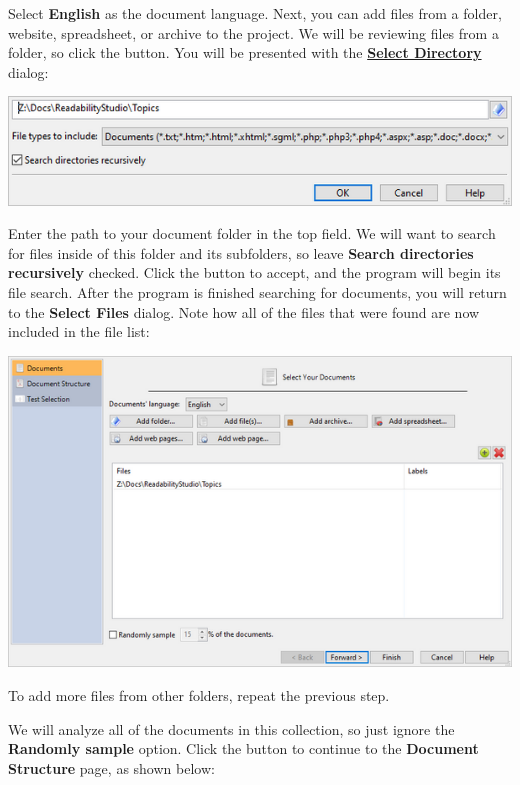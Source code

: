 \documentclass[
]{book}
\theoremstyle{definition}
\theoremstyle{definition}
\theoremstyle{definition}
\theoremstyle{definition}
\theoremstyle{remark}
\begin{document}
Select \textbf{English} as the document language. Next, you can add files from a folder, website, spreadsheet, or archive to the project. We will be reviewing files from a folder, so click the  button. You will be presented with the \protect\hyperlink{select-directory}{\textbf{Select Directory}} dialog:

\begin{center}\includegraphics[width=0.75\linewidth,]{Images/selectdirectory} \end{center}

Enter the path to your document folder in the top field. We will want to search for files inside of this folder and its subfolders, so leave \textbf{Search directories recursively} checked. Click the  button to accept, and the program will begin its file search. After the program is finished searching for documents, you will return to the \textbf{Select Files} dialog. Note how all of the files that were found are now included in the file list:

\includegraphics{Images/wizardbatchselectfilesloaded.png}

To add more files from other folders, repeat the previous step.

We will analyze all of the documents in this collection, so just ignore the \textbf{Randomly sample} option. Click the  button to continue to the \textbf{Document Structure} page, as shown below:
\end{document}
